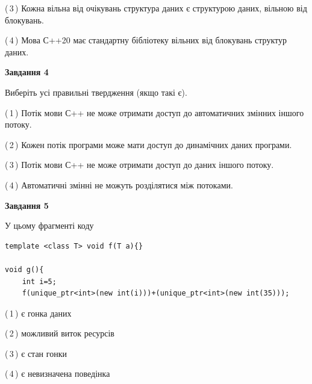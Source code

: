 \documentclass[12pt, ukrainian]{article}
\begin{document}
\begin {large}
{(\,3\,) Кожна вільна від очікувань структура даних є структурою даних, вільною від блокувань.%

(\,4\,) Мова С++20 має стандартну бібліотеку вільних від блокувань структур даних.%



\begin{center}
\textbf{Завдання 4}
\end{center}
Виберіть усі правильні твердження (якщо такі є).\par
\vspace{2mm}

(\,1\,) Потік мови С++ не може отримати доступ до автоматичних змінних іншого потоку.%

(\,2\,) Кожен потік програми може мати доступ до динамічних даних програми.%

(\,3\,) Потік мови С++ не може отримати доступ до даних іншого потоку.%

(\,4\,) Автоматичні змінні не можуть розділятися між потоками.%



\begin{center}
\textbf{Завдання 5}
\end{center}
У цьому фрагменті коду
\begin{verbatim}
template <class T> void f(T a){}

void g(){
    int i=5;
    f(unique_ptr<int>(new int(i)))+(unique_ptr<int>(new int(35)));
\end{verbatim}
(\,1\,) є гонка даних%

(\,2\,) можливий виток ресурсів%

(\,3\,) є стан гонки%

(\,4\,) є невизначена поведінка%


}
\end {large}
\end{document}

